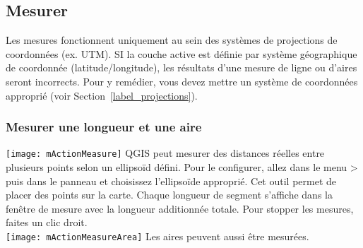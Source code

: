 %

\subsection{Mesurer}\label{sec:measure}

Les mesures fonctionnent uniquement au sein des systèmes de projections de coordonnées (ex. UTM). SI la couche active est définie par système géographique de coordonnée (latitude/longitude), les résultats d'une mesure de ligne ou d'aires seront incorrects. Pour y remédier, vous devez mettre un système de coordonnées approprié (voir Section~\ref{label_projections}).


\subsubsection{Mesurer une longueur et une aire}
\texttt{[image: mActionMeasure]} 
QGIS peut mesurer des distances réelles entre plusieurs points selon un ellipsoïd défini. Pour le configurer, allez dans le menu  > puis dans le panneau  et choisissez l'ellipsoïde approprié. Cet outil permet de placer des points sur la carte. Chaque longueur de segment s'affiche dans la fenêtre de mesure avec la longueur additionnée totale. Pour stopper les mesures, faites un clic droit. \\
\texttt{[image: mActionMeasureArea]} Les aires peuvent aussi être mesurées.

